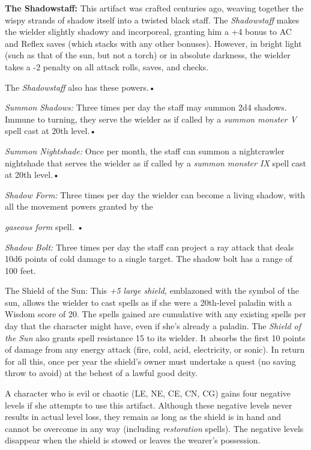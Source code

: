\documentclass{article}
\begin{document}
\vspace{12pt}
\textbf{The Shadowstaff:} This artifact was crafted centuries ago, weaving together 
the wispy strands of shadow itself into a twisted black staff. The \textit{Shadowstaff 
}makes the wielder slightly shadowy and incorporeal, granting him a +4 bonus to 
AC and Reflex saves (which stacks with any other bonuses). However, in bright light 
(such as that of the sun, but not a torch) or in absolute darkness, the wielder 
takes a -2 penalty on all attack rolls, saves, and checks. 

The \textit{Shadowstaff }also has these powers.• 

\textit{Summon Shadows: }Three times per day the staff may summon 2d4 shadows. 
Immune to turning, they serve the wielder as if called by a \textit{summon monster 
V }spell cast at 20th level.• 

\textit{Summon Nightshade: }Once per month, the staff can summon a nightcrawler 
nightshade that serves the wielder as if called by a \textit{summon monster IX 
}spell cast at 20th level.• 

\textit{Shadow Form: }Three times per day the wielder can become a living shadow, 
with all the movement powers granted by the

\textit{gaseous form }spell. • 

\textit{Shadow Bolt: }Three times per day the staff can project a ray attack that 
deals 10d6 points of cold damage to a single target. The shadow bolt has a range 
of 100 feet.

\vspace{12pt}
The Shield of the Sun: This \textit{+5 large shield, }emblazoned with the symbol 
of the sun, allows the wielder to cast spells as if she were a 20th-level paladin 
with a Wisdom score of 20. The spells gained are cumulative with any existing spells 
per day that the character might have, even if she's already a paladin. The \textit{Shield 
of the Sun }also grants spell resistance 15 to its wielder. It absorbs the first 
10 points of damage from any energy attack (fire, cold, acid, electricity, or sonic). 
In return for all this, once per year the shield's owner must undertake a quest 
(no saving throw to avoid) at the behest of a lawful good deity. 

A character who is evil or chaotic (LE, NE, CE, CN, CG) gains four negative levels 
if she attempts to use this artifact. Although these negative levels never results 
in actual level loss, they remain as long as the shield is in hand and cannot be 
overcome in any way (including \textit{restoration }spells). The negative levels 
disappear when the shield is stowed or leaves the wearer's possession.

\newpage
\end{document}
